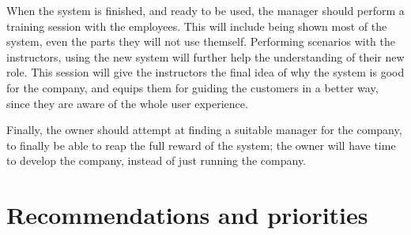 When the system is finished, and ready to be used, the manager should perform
a training session with the employees. This will include being shown most of 
the system, even the parts they will not use themself. Performing scenarios
with the instructors, using the new system will further help the understanding
of their new role. This session will give the instructors the final idea
of why the system is good for the company, and equips them for guiding the 
customers in a better way, since they are aware of the whole user experience.

Finally, the owner should attempt at finding a suitable manager for the 
company, to finally be able to reap the full reward of the system; the owner
will have time to develop the company, instead of just running the company.

\newpage
\section{Recommendations and priorities}

\newpage
